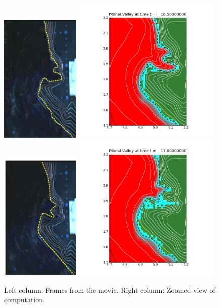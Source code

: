 \begin{figure}[ht]
\hfil\includegraphics[width=1.5in]{bp7/movie/Frame55.png}\hfil
\hfil\includegraphics[width=2.8in]{bp7/figs423/frame0011fig10.png}\hfil
\vskip 5pt
\hfil\includegraphics[width=1.5in]{bp7/movie/Frame70.png}\hfil
\hfil\includegraphics[width=2.8in]{bp7/figs423/frame0013fig10.png}\hfil
\vskip 5pt
\caption{\label{fig:bp7framesB} 
Left column: Frames from the movie.
Right column: Zoomed view of computation.
  }
\end{figure}


